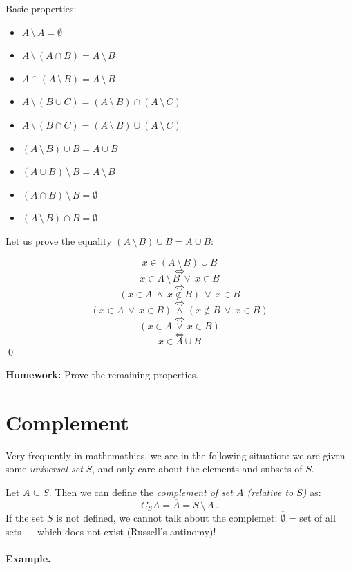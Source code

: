 \documentclass[11pt,paper=b5,footinclude,headinclude]{scrbook} %
\def\ali {{~\vee~}}
\def\inn {{~\wedge~}}
\def\brez {{\,\setminus\,}}
\def\cee {{~\Leftrightarrow~}}
\theoremstyle{remark}
\theoremstyle{definition} %
\theoremstyle{theorem} %
\begin{document}
Basic properties:
\begin{itemize}
  \item $A\brez A = \emptyset$

  \item $A\brez (A\cap B) = A\brez B$

  \item $A\cap (A\brez B) = A\brez B$

  \item $A\brez (B\cup C) = (A\brez B)\cap (A\brez C)$

  \item $A\brez (B\cap C) = (A\brez B)\cup (A\brez C)$

  \item $(A\brez B)\cup B = A\cup B$

  \item $(A\cup B)\brez B = A\brez B$

  \item $(A\cap B)\brez B = \emptyset$

  \item $(A\brez B)\cap B = \emptyset$
\end{itemize}

Let us prove the equality $(A\brez B)\cup B = A\cup B$:

$$x\in (A\brez B)\cup B$$
$$\cee$$
$$x\in A\brez B \ali x\in B$$
$$\cee$$
$$(x\in A\inn x\not\in B) \ali x\in B$$
$$\cee$$
$$(x\in A\ali x\in B) \inn (x\not\in B \ali x\in B)$$
$$\cee$$
$$(x\in A\ali x\in B)$$
$$\cee$$
$$x\in A\cup B$$
\qed

\bigskip
\textbf{ Homework:} Prove the remaining properties.

\bigskip
\bigskip

\section{Complement}
Very frequently in mathemathics, we are in the following situation: we are given some
{\em universal set} $S$, and only care about the elements and subsets of $S$.

Let $A\subseteq S$. Then we can define the  {\em complement of set $A$ (relative to $S$)} as:
$$C_SA = \overline A = S\brez A\,.$$
If the set $S$ is not defined, we cannot talk about the complemet:
$\overline \emptyset$ = set of all sets  --- which does not exist (Russell's antinomy)!

\bigskip
\paragraph{Example.}
\end{document}
